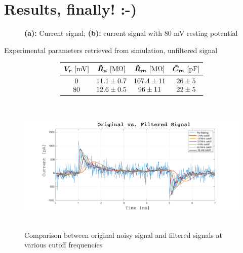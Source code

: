 \documentclass[a4paper]{article}
\begin{document}
\section{Results, finally! :-)}
\begin{figure}
\centering
{}
\caption{\textbf{(a):} Current signal; \textbf{(b):} current signal with 80 mV resting potential}
\end{figure}

\begin{table}[h]
\caption{Experimental parameters retrieved from simulation, unfiltered signal}
\label{tab:parameters_nofilter}
\vspace{-.4cm}
\centering
\[
\begin{array}{cccc}
\toprule
\bm{V_r}\ [\si{\mV}]&\bm{\tilde{R}_a}\ [\si{\mega \ohm}]&\bm{\tilde{R}_m}\ [\si{\mega\ohm}]& \bm{\tilde{C}_m}\ [\si{\pico\farad}]\\
\midrule
0&11.1\pm 0.7& 107.4 \pm 11 & 26\pm 5\\
80 & 12.6\pm 0.5 & 96\pm11 & 22\pm 5\\ 
\bottomrule
\end{array}
\]
\end{table}

\begin{figure}
\centering
\includegraphics[height=6.5cm]{Bess_all_freq.pdf}
\caption{Comparison between original noisy signal and filtered signals at various cutoff frequencies}
\label{fig:Bess_all_freq}
\end{figure}
\end{document}
